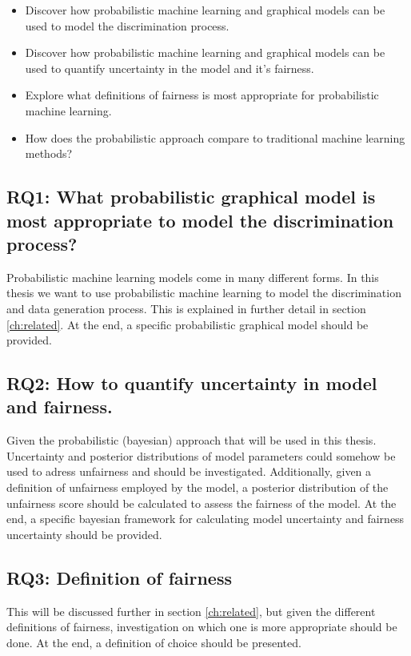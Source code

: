 \begin{itemize}
    \item Discover how probabilistic machine learning and graphical models can be used to model the discrimination process.
    \item Discover how probabilistic machine learning and graphical models can be used to quantify uncertainty in the model and it's fairness.
    \item Explore what definitions of fairness is most appropriate for probabilistic machine learning.
    \item How does the probabilistic approach compare to traditional machine learning methods?
\end{itemize}

\subsection{RQ1: What probabilistic graphical model is most appropriate to model the discrimination process?}

Probabilistic machine learning models come in many different forms. In this thesis we want to use probabilistic machine learning to model the discrimination and data generation process. This is explained in further detail in section \ref{ch:related}. At the end, a specific probabilistic graphical model should be provided.

\subsection{RQ2: How to quantify uncertainty in model and fairness.}

Given the probabilistic (bayesian) approach that will be used in this thesis. Uncertainty and posterior distributions of model parameters could somehow be used to adress unfairness and should be investigated. Additionally, given a definition of unfairness employed by the model, a posterior distribution of the unfairness score should be calculated to assess the fairness of the model. At the end, a specific bayesian framework for calculating model uncertainty and fairness uncertainty should be provided.

\subsection{RQ3: Definition of fairness}

This will be discussed further in section \ref{ch:related}, but given the different definitions of fairness, investigation on which one is more appropriate should be done. At the end, a definition of choice should be presented.

